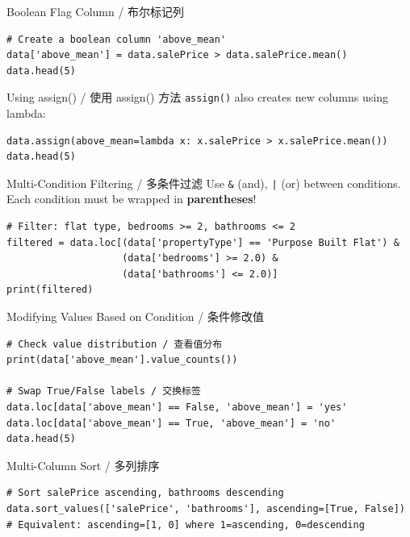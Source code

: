 \documentclass[11pt,a4paper]{report}
\let\oldtexttt\texttt
\renewcommand{\texttt}[1]{\textcolor{mainblue}{\oldtexttt{#1}}}
\begin{document}
\begin{examplebox}{Boolean Flag Column / 布尔标记列}
\begin{lstlisting}
# Create a boolean column 'above_mean'
data['above_mean'] = data.salePrice > data.salePrice.mean()
data.head(5)
\end{lstlisting}
\end{examplebox}

\begin{examplebox}{Using assign() / 使用 assign() 方法}
    \texttt{assign()} also creates new columns using lambda:
\begin{lstlisting}
data.assign(above_mean=lambda x: x.salePrice > x.salePrice.mean())
data.head(5)
\end{lstlisting}
\end{examplebox}

\begin{examplebox}{Multi-Condition Filtering / 多条件过滤}
    Use \texttt{\&} (and), \texttt{|} (or) between conditions. Each condition must be wrapped in \textbf{parentheses}!
\begin{lstlisting}
# Filter: flat type, bedrooms >= 2, bathrooms <= 2
filtered = data.loc[(data['propertyType'] == 'Purpose Built Flat') &
                    (data['bedrooms'] >= 2.0) &
                    (data['bathrooms'] <= 2.0)]
print(filtered)
\end{lstlisting}
\end{examplebox}

\begin{examplebox}{Modifying Values Based on Condition / 条件修改值}
\begin{lstlisting}
# Check value distribution / 查看值分布
print(data['above_mean'].value_counts())

# Swap True/False labels / 交换标签
data.loc[data['above_mean'] == False, 'above_mean'] = 'yes'
data.loc[data['above_mean'] == True, 'above_mean'] = 'no'
data.head(5)
\end{lstlisting}
\end{examplebox}

\begin{examplebox}{Multi-Column Sort / 多列排序}
\begin{lstlisting}
# Sort salePrice ascending, bathrooms descending
data.sort_values(['salePrice', 'bathrooms'], ascending=[True, False])
# Equivalent: ascending=[1, 0] where 1=ascending, 0=descending
\end{lstlisting}
\end{examplebox}
\end{document}
